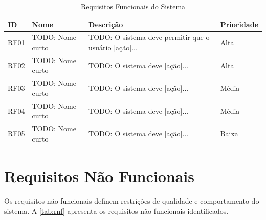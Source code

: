 \begin{table}[H]
  \caption{Requisitos Funcionais do Sistema}
  \label{tab:rf}
  \centering
  \begin{tabularx}{\textwidth}{llXl}
    \toprule
    \textbf{ID}   & \textbf{Nome}        & \textbf{Descrição}
                  & \textbf{Prioridade}  \\
    \midrule
    RF01 & TODO: Nome curto & TODO: O sistema deve permitir que o
           usuário [ação]...                    & Alta   \\
    RF02 & TODO: Nome curto & TODO: O sistema deve [ação]...
                                                & Alta   \\
    RF03 & TODO: Nome curto & TODO: O sistema deve [ação]...
                                                & Média  \\
    RF04 & TODO: Nome curto & TODO: O sistema deve [ação]...
                                                & Média  \\
    RF05 & TODO: Nome curto & TODO: O sistema deve [ação]...
                                                & Baixa  \\
    \bottomrule
  \end{tabularx}
\end{table}


\section{Requisitos Não Funcionais}
\label{sec:requisitos-nao-funcionais}

Os requisitos não funcionais definem restrições de qualidade e
comportamento do sistema. A \cref{tab:rnf} apresenta os requisitos não
funcionais identificados.

